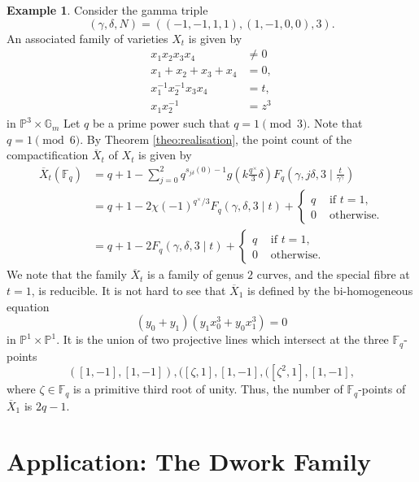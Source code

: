 \documentclass[11pt, reqno]{amsart}
\theoremstyle{plain}
\theoremstyle{definition}
\newtheorem{exa}[theo]{Example}
\newcommand{\Ps}{\mathbb{P}}
\newcommand{\F}{\mathbb{F}}
\newcommand{\ga}{\gamma}
\newcommand{\G}{\mathbb{G}}
\begin{document}
\begin{exa}
Consider the gamma triple
\[
(\ga,\delta,N)= ((-1,-1,1,1),(1,-1,0,0),3).
\]
An associated family of varieties $X_t$ is given by 
\begin{align*}
x_1 x_2 x_3 x_4 &\neq 0\\
x_1 +x_2 +x_3 +x_4 &= 0,\\
x_1^{-1}x_2^{-1}x_3 x_4&=t,\\
x_1 x_2^{-1} &= z^{3}
\end{align*}
in $\Ps^{3} \times \G_m$
Let $q$ be a prime power such that $q=1 \pmod{3}$. Note that $q=1 \pmod{6}$. By Theorem \ref{theo:realisation}, the point count of the compactification $\overline{X}_t$ of $X_t$ is given by 
    \begin{align*}
    \overline{X}_t(\F_q) &= q+1 -\sum_{j=0}^{2} q^{s_{j\delta}(0)-1} g\left(k\frac{q^\times}{3} \delta \right) F_q\left(\gamma, j \delta, 3 \mid \frac{t}{\gamma^\gamma}\right)\\
    &= q+1 -  2\chi(-1)^{q^{\times}/3} F_q\left(\ga,\delta,3 \mid t\right)+ \begin{cases}
    q & \text{ if } t=1,\\
    0 & \text{ otherwise}.
    \end{cases}\\
    &= q+1 -  2 F_q\left(\ga,\delta,3 \mid t\right)+ \begin{cases}
    q & \text{ if } t=1,\\
    0 & \text{ otherwise}.
    \end{cases}
    \end{align*}
We note that the family $\overline{X}_t$ is a family of genus $2$ curves, and the special fibre at $t=1$, is reducible. It is not hard to see that $\overline{X}_1$ is defined by the bi-homogeneous equation
\[
(y_0+y_1) (y_1x_0^3+y_0x_1^3) =0 
\]
in $\Ps^1\times \Ps^1$.
It is the union of two projective lines which intersect at the three $\F_q$-points 
\[
([1,-1],[1,-1]), ([\zeta,1],[1,-1],([\zeta^2,1],[1,-1],
\]
where $\zeta \in \F_q$ is a primitive third root of unity. Thus, the number of $\F_q$-points of $\overline{X}_1$ is $2q-1$.
\end{exa}


\section{Application: The Dwork Family }\label{section:dwork}
\end{document}
